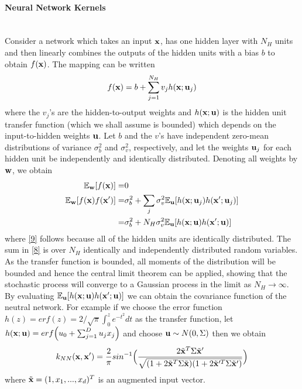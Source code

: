\documentclass[11pt]{article}
\begin{document}
\paragraph{Neural Network Kernels}\mbox{}\\
Consider a network which takes an input ${\bf x}$, has one hidden layer with $N_H$ units and then linearly combines the outputs of the hidden units with a bias $b$ to obtain $f({\bf x})$. The mapping can be written
\begin{align*}
f({\bf x})=b+\sum_{j=1}^{N_H}v_j h({\bf x};{\bf u}_j)
\end{align*}
where the $v_j$'s are the hidden-to-output weights and $h({\bf x};{\bf u})$ is the hidden unit transfer function (which we shall assume is bounded) which depends on the input-to-hidden weights ${\bf u}$. Let $b$ and the $v$'s have independent zero-mean distributions of variance $\sigma_b^2$ and $\sigma_v^2$, respectively, and let the weights ${\bf u}_j$ for each hidden unit be independently and identically distributed. Denoting all weights by ${\bf w}$, we obtain
\begin{align}
\mathbb{E}_{\bf w}[f({\bf x})]=&0\nonumber \\
\mathbb{E}_{\bf w}[f({\bf x})f({\bf x}')]=&\sigma_b^2+\sum_j \sigma_v^2 \mathbb{E}_{\bf u}[h({\bf x}; {\bf u}_j)h({\bf x}'; {\bf u}_j)] \label{8} \\
=&\sigma_b^2+N_H\sigma_v^2 \mathbb{E}_{\bf u}[h({\bf x}; {\bf u})h({\bf x}'; {\bf u})] \label{9}
\end{align}
where \eqref{9} follows because all of the hidden units are identically distributed. The sum in \eqref{8} is over $N_H$ identically and independently distributed random variables. As the transfer function is bounded, all moments of the distribution will be bounded and hence the central limit theorem can be applied, showing that the stochastic process will converge to a Gaussian process in the limit as $N_H \rightarrow \infty$.\\
By evaluating $\mathbb{E}_{\bf u}[h({\bf x}; {\bf u})h({\bf x}'; {\bf u})]$ we can obtain the covariance function of the neutral network. For example if we choose the error function $h(z)=erf(z)=2/\sqrt{\pi}\int_0^z e^{-t^2}dt$ as the transfer function, let $h({\bf x};{\bf u})=erf\Big(u_0+\sum_{j=1}^Du_jx_j\Big)$ and choose ${\bf u} \sim N(0, \Sigma)$ then we obtain
\begin{align*}
k_{NN}({\bf x}, {\bf x}')=\frac{2}{\pi}sin^{-1}\Big(\frac{2\tilde{{\bf x}}^T\Sigma \tilde{{\bf x}}'}{\sqrt{(1+2\tilde{{\bf x}}^T\Sigma \tilde{{\bf x}})(1+2\tilde{{\bf x}}'^T\Sigma \tilde{{\bf x}}')}}\Big)
\end{align*}
where $\tilde{{\bf x}}=(1, x_1, ..., x_d)^T$ is an augmented input vector.
\end{document}
